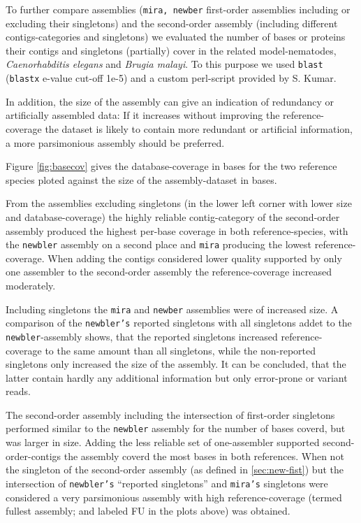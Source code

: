 \documentclass[12pt,a4paper]{article}
\begin{document}
To further compare assemblies (\texttt{mira, newber} first-order
assemblies including or excluding their singletons) and the
second-order assembly (including different contigs-categories and
singletons) we evaluated the number of bases or proteins their contigs
and singletons (partially) cover in the related model-nematodes,
\textit{Caenorhabditis elegans} and \textit{Brugia malayi}. To this
purpose we used \texttt{blast} (\texttt{blastx} e-value cut-off 1e-5)
and a custom perl-script provided by S. Kumar.

In addition, the size of the assembly can give an indication of
redundancy or artificially assembled data: If it increases without
improving the reference-coverage the dataset is likely to contain
more redundant or artificial information, a more parsimonious assembly
should be preferred.

Figure \ref{fig:basecov} gives the database-coverage in bases for the
two reference species ploted against the size of the assembly-dataset
in bases.

From the assemblies excluding singletons (in the lower left corner
with lower size and database-coverage) the highly reliable
contig-category of the second-order assembly produced the highest
per-base coverage in both reference-species, with the \texttt{newbler}
assembly on a second place and \texttt{mira} producing the lowest
reference-coverage. When adding the contigs considered lower quality
supported by only one assembler to the second-order assembly the
reference-coverage increased moderately.

Including singletons the \texttt{mira} and \texttt{newber} assemblies
were of increased size. A comparison of the \texttt{newbler's}
reported singletons with all singletons addet to the
\texttt{newbler}-assembly shows, that the reported singletons
increased reference-coverage to the same amount than all singletons,
while the non-reported singletons only increased the size of the
assembly. It can be concluded, that the latter contain hardly any
additional information but only error-prone or variant reads.

The second-order assembly including the intersection of first-order
singletons performed similar to the \texttt{newbler} assembly for the
number of bases coverd, but was larger in size. Adding the less
reliable set of one-assembler supported second-order-contigs the
assembly coverd the most bases in both references. When not the
singleton of the second-order assembly (as defined in
\ref{sec:new-fist}) but the intersection of \texttt{newbler's}
``reported singletons'' and \texttt{mira's} singletons were considered
a very parsimonious assembly with high reference-coverage (termed
fullest assembly; and labeled FU in the plots above) was obtained.
\end{document}
